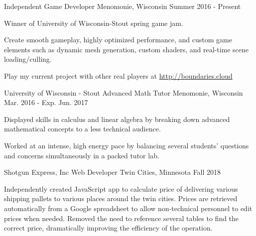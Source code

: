 \begin{cventries}
  \cventry
    {Independent} %
    {Game Developer} %
    {Menomonie, Wisconsin} %
    {Summer 2016 - Present} %
    {
      \begin{cvitems} %
        \item {Winner of University of Wisconsin-Stout spring game jam.}
        \item {Create smooth gameplay, highly optimized performance, and custom game elements such as dynamic mesh generation, custom shaders, and real-time scene loading/culling.}
        \item {Play my current project with other real players at \url{http://boundaries.cloud}}
      \end{cvitems}
    }

  \cventry
    {University of Wisconsin - Stout} %
    {Advanced Math Tutor} %
    {Menomonie, Wisconsin} %
    {Mar. 2016 - Exp. Jun. 2017} %
    {
      \begin{cvitems} %
        \item {Displayed skills in calculus and linear algebra by breaking down advanced mathematical concepts to a less technical audience.}
        \item {Worked at an intense, high energy pace by balancing several students’ questions and concerns simultaneously in a packed tutor lab.}
      \end{cvitems}
    }

  \cventry
    {Shotgun Express, Inc}
    {Web Developer}
    {Twin Cities, Minnesota} %
    {Fall 2018} %
    {
      \begin{cvitems} %
        \item {Independently created JavaScript app to calculate price of delivering various shipping pallets to various places around the twin cities. Prices are retrieved automatically from a Google spreadsheet to allow non-technical personnel to edit prices when needed. Removed the need to reference several tables to find the correct price, dramatically improving the efficiency of the operation.}
      \end{cvitems}
    }


\end{cventries}
